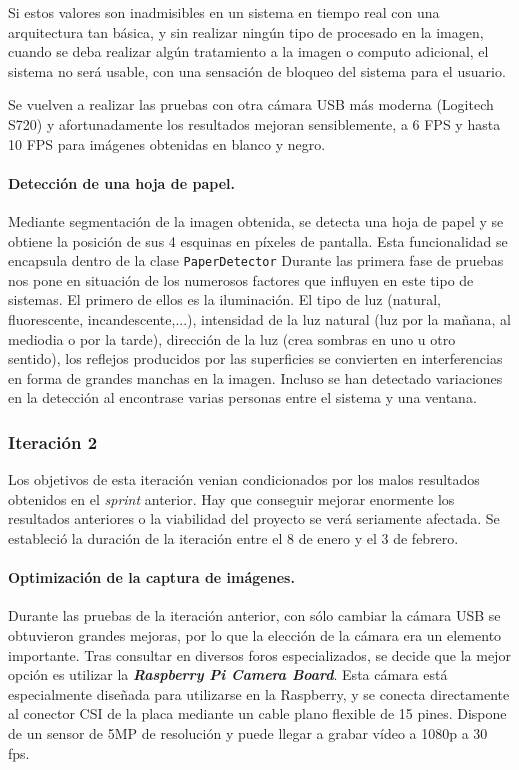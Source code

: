Si estos valores son inadmisibles en un sistema en tiempo real con una arquitectura tan básica, y sin realizar ningún tipo de procesado en la imagen, cuando se deba realizar algún tratamiento a la imagen o computo adicional, el sistema no será usable, con una sensación de bloqueo del sistema para el usuario.

Se vuelven a realizar las pruebas con otra cámara USB más moderna (Logitech S720) y afortunadamente los resultados mejoran sensiblemente, a 6 FPS y hasta 10 FPS para imágenes obtenidas en blanco y negro.  
   
\paragraph{Detección de una hoja de papel.}
Mediante segmentación de la imagen obtenida, se detecta una hoja de papel y se obtiene la posición de sus 4 esquinas en píxeles de pantalla. Esta funcionalidad se encapsula dentro de la clase \texttt{PaperDetector}
Durante las primera fase de pruebas nos pone en situación de los numerosos factores que influyen en este tipo de sistemas. El primero de ellos es la iluminación. El tipo de luz (natural, fluorescente, incandescente,...), intensidad de la luz natural (luz por la mañana, al mediodia o por la tarde), dirección de la luz (crea sombras en uno u otro sentido), los reflejos producidos por las superficies se convierten en interferencias en forma de grandes manchas en la imagen. Incluso se han detectado variaciones en la detección al encontrase varias personas entre el sistema y una ventana.
 
\subsubsection{Iteración 2}
Los objetivos de esta iteración venian condicionados por los malos resultados obtenidos en el \textit{sprint} anterior. Hay que conseguir mejorar enormente los resultados anteriores o la viabilidad del proyecto se verá seriamente afectada. Se estableció la duración de la iteración entre el 8 de enero y el 3 de febrero.  

\paragraph{Optimización de la captura de imágenes.}
Durante las pruebas de la iteración anterior, con sólo cambiar la cámara USB se obtuvieron grandes mejoras, por lo que la elección de la cámara era un elemento importante. Tras consultar en diversos foros especializados, se decide que la mejor opción es utilizar la \textbf{\textit{Raspberry Pi Camera Board}}. Esta cámara está especialmente diseñada para utilizarse en la Raspberry, y se conecta directamente al conector CSI de la placa mediante un cable plano flexible de 15 pines. Dispone de un sensor de 5MP de resolución y puede llegar a grabar vídeo a 1080p a 30 fps.

